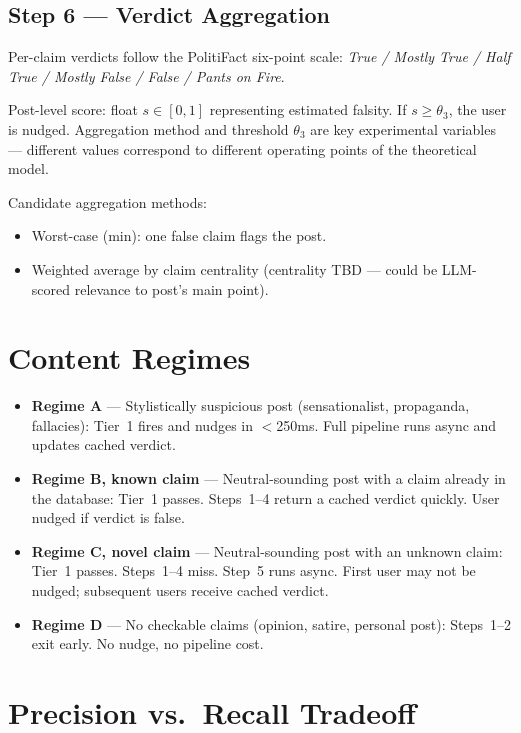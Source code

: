\subsection{Step 6 --- Verdict Aggregation}

Per-claim verdicts follow the PolitiFact six-point scale:
\textit{True / Mostly True / Half True / Mostly False / False / Pants on Fire}.

Post-level score: float $s \in [0, 1]$ representing estimated falsity.
If $s \geq \theta_3$, the user is nudged. Aggregation method and threshold $\theta_3$ are key experimental variables --- different values correspond to different operating points of the theoretical model.

Candidate aggregation methods:
\begin{itemize}
  \item Worst-case (min): one false claim flags the post.
  \item Weighted average by claim centrality (centrality TBD --- could be LLM-scored relevance to post's main point).
\end{itemize}

\section{Content Regimes}

\begin{itemize}
  \item \textbf{Regime A} --- Stylistically suspicious post (sensationalist, propaganda, fallacies):
    Tier~1 fires and nudges in $<$250ms. Full pipeline runs async and updates cached verdict.

  \item \textbf{Regime B, known claim} --- Neutral-sounding post with a claim already in the database:
    Tier~1 passes. Steps~1--4 return a cached verdict quickly. User nudged if verdict is false.

  \item \textbf{Regime C, novel claim} --- Neutral-sounding post with an unknown claim:
    Tier~1 passes. Steps~1--4 miss. Step~5 runs async. First user may not be nudged; subsequent users receive cached verdict.

  \item \textbf{Regime D} --- No checkable claims (opinion, satire, personal post):
    Steps~1--2 exit early. No nudge, no pipeline cost.
\end{itemize}

\section{Precision vs.\ Recall Tradeoff}

